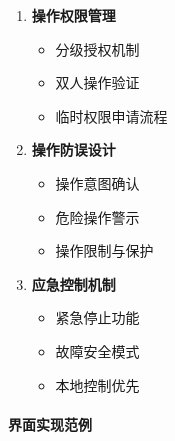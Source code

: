 \begin{enumerate}
\def\labelenumi{\arabic{enumi}.}
\tightlist
\item
  \textbf{操作权限管理}

  \begin{itemize}
  \tightlist
  \item
    分级授权机制
  \item
    双人操作验证
  \item
    临时权限申请流程
  \end{itemize}
\item
  \textbf{操作防误设计}

  \begin{itemize}
  \tightlist
  \item
    操作意图确认
  \item
    危险操作警示
  \item
    操作限制与保护
  \end{itemize}
\item
  \textbf{应急控制机制}

  \begin{itemize}
  \tightlist
  \item
    紧急停止功能
  \item
    故障安全模式
  \item
    本地控制优先
  \end{itemize}
\end{enumerate}

\paragraph{界面实现范例}\label{ux754cux9762ux5b9eux73b0ux8303ux4f8b}

